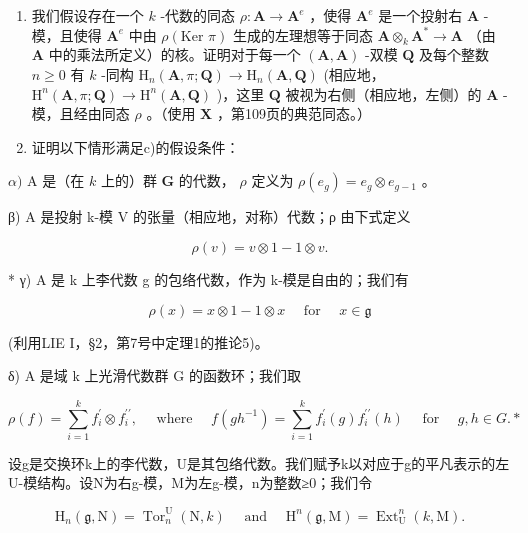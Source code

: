 \begin{enumerate}
\def\labelenumi{\alph{enumi})}
\setcounter{enumi}{2}
\item
  我们假设存在一个 \(k\) -代数的同态 \(\rho: \mathbf{A} \to \mathbf{A}^e\) ，使得 \(\mathbf{A}^e\) 是一个投射右 \(\mathbf{A}\) -模，且使得 \(\mathbf{A}^e\) 中由 \(\rho(\text{Ker } \pi)\) 生成的左理想等于同态 \(\mathbf{A} \otimes_k \mathbf{A}^* \to \mathbf{A}\) （由 \(\mathbf{A}\) 中的乘法所定义）的核。证明对于每一个 \((\mathbf{A}, \mathbf{A})\) -双模 \(\mathbf{Q}\) 及每个整数 \(n \geqslant 0\) 有 \(k\) -同构 \(\mathrm{H}_n(\mathbf{A}, \pi; \mathbf{Q}) \to \mathrm{H}_n(\mathbf{A}, \mathbf{Q})\) (相应地， \(\mathrm{H}^n(\mathbf{A}, \pi; \mathbf{Q}) \to \mathrm{H}^n(\mathbf{A}, \mathbf{Q})\) )，这里 \(\mathbf{Q}\) 被视为右侧（相应地，左侧）的 \(\mathbf{A}\) -模，且经由同态 \(\rho\) 。（使用 \(\mathbf{X}\) ，第109页的典范同态。）
\item
  证明以下情形满足c)的假设条件：
\end{enumerate}

\(\alpha)\) A 是（在 \(k\) 上的）群 \(\mathbf{G}\) 的代数， \(\rho\) 定义为 \(\rho(e_g) = e_g \otimes e_{g-1}\) 。

β) A 是投射 k-模 V 的张量（相应地，对称）代数；ρ 由下式定义

\[
\rho (v) = v \otimes 1 - 1 \otimes v.
\]

* γ) A 是 k 上李代数 g 的包络代数，作为 k-模是自由的；我们有

\[
\rho (x) = x \otimes 1 - 1 \otimes x \quad \text { for } \quad x \in \mathfrak {g}
\]

(利用LIE I，§2，第7号中定理1的推论5)。

δ) A 是域 k 上光滑代数群 G 的函数环；我们取

\[
\rho (f) = \sum_ {i = 1} ^ {k} f _ {i} ^ {\prime} \otimes f _ {i} ^ {\prime \prime}, \quad \text { where } \quad f (g h ^ {- 1}) = \sum_ {i = 1} ^ {k} f _ {i} ^ {\prime} (g) f _ {i} ^ {\prime \prime} (h) \quad \text { for } \quad g, h \in G. *
\]

设g是交换环k上的李代数，U是其包络代数。我们赋予k以对应于g的平凡表示的左U-模结构。设N为右g-模，M为左g-模，n为整数≥0；我们令

\[
\mathrm{H} _ {n} (\mathfrak {g}, \mathrm{N}) = \operatorname{Tor} _ {n} ^ {\mathrm{U}} (\mathrm{N}, k) \quad \text { and } \quad \mathrm{H} ^ {n} (\mathfrak {g}, \mathrm{M}) = \operatorname{Ext} _ {\mathrm{U}} ^ {n} (k, \mathrm{M}).
\]

